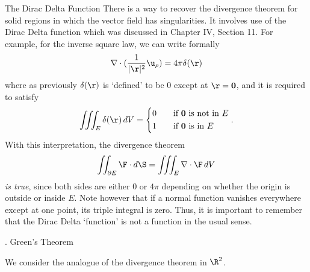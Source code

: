 \smallskip
{}
\smallskip
\subhead The Dirac Delta Function \endsubhead
There is a way to recover the divergence theorem for solid regions
in which the vector field has singularities.  It involves use of the
Dirac Delta function which was discussed in Chapter IV, Section 11.
%
For example, for the inverse square law, we can write formally
$$
       \nabla\cdot (\frac 1{|\r|^2}\u_\rho) = 4\pi \delta(\r)
$$
where as previously $\delta(\r)$ is `defined' to be 0 except at
$\r = \bold 0$, and it is required to satisfy
$$
   \iiint_E \delta(\r)\, dV = \left\{ \aligned
                   0\qquad&\text{if $\bold 0$ is not in $E$} \\
                   1\qquad&\text{if $\bold 0$ is in $E$}
\endaligned \right. .
$$
With this interpretation, the divergence theorem 
$$
   \iint_{\partial E} \F\cdot d\S = \iiint_E \nabla\cdot\F\, dV
$$
{\it is true\/}, since both sides are either $0$ or $4\pi$ depending on whether
the origin is outside or inside $E$.  Note however that if a normal
function vanishes everywhere except at one point, its
 triple integral 
 is zero.  Thus, it is important to  remember that the
Dirac Delta `function' is not a function in the usual sense.

\bigskip

\bigskip
{}
\head \sn. Green's Theorem \endhead

We consider the analogue of the divergence theorem in $\R^2$.

